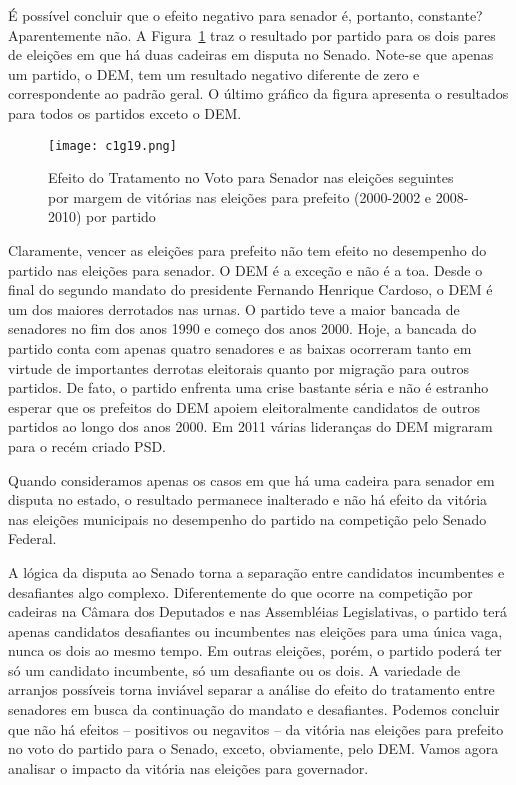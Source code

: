 É possível concluir que o efeito negativo para senador é, portanto, constante? Aparentemente não. A Figura~\ref{fig:c1g19} traz o resultado por partido para os dois pares de eleições em que há duas cadeiras em disputa no Senado. Note-se que apenas um partido, o DEM, tem um resultado negativo diferente de zero e correspondente ao padrão geral. O último gráfico da figura apresenta o resultados para todos os partidos exceto o DEM.

\begin{figure}[htp]
	\centering
	\texttt{[image: c1g19.png]} 
	\caption{Efeito do Tratamento no Voto para Senador nas eleições seguintes por margem de vitórias nas eleições para prefeito (2000-2002 e 2008-2010) por partido}
	\label{fig:c1g19} 
\end{figure}

Claramente, vencer as eleições para prefeito não tem efeito no desempenho do partido nas eleições para senador. O DEM é a exceção e não é a toa. Desde o final do segundo mandato do presidente Fernando Henrique Cardoso, o DEM é um dos maiores derrotados nas urnas. O partido teve a maior bancada de senadores no fim dos anos 1990 e começo dos anos 2000. Hoje, a bancada do partido conta com apenas quatro senadores e as baixas ocorreram tanto em virtude de importantes derrotas eleitorais quanto por migração para outros partidos. De fato, o partido enfrenta uma crise bastante séria e não é estranho esperar que os prefeitos do DEM apoiem eleitoralmente candidatos de outros partidos ao longo dos anos 2000. Em 2011 várias lideranças do DEM migraram para o recém criado PSD. 

Quando consideramos apenas os casos em que há uma cadeira para senador em disputa no estado, o resultado permanece inalterado e não há efeito da vitória nas eleições municipais no desempenho do partido na competição pelo Senado Federal.

A lógica da disputa ao Senado torna a separação entre candidatos incumbentes e desafiantes algo complexo. Diferentemente do que ocorre na competição por cadeiras na Câmara dos Deputados e nas Assembléias Legislativas, o partido terá apenas candidatos desafiantes ou incumbentes nas eleições para uma única vaga, nunca os dois ao mesmo tempo. Em outras eleições, porém, o partido poderá ter só um candidato incumbente, só um desafiante ou os dois. A variedade de arranjos possíveis torna inviável separar a análise do efeito do tratamento entre senadores em busca da continuação do mandato e desafiantes. Podemos concluir que não há efeitos -- positivos ou negavitos -- da vitória nas eleições para prefeito no voto do partido para o Senado, exceto, obviamente, pelo DEM. Vamos agora analisar o impacto da vitória nas eleições para governador. 

